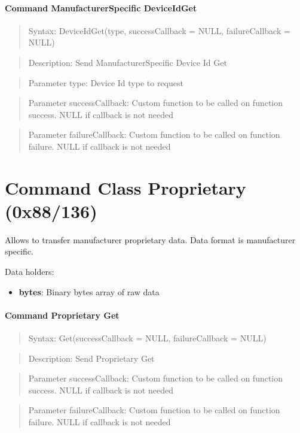 \paragraph{Command ManufacturerSpecific DeviceIdGet}
\begin{quote}Syntax: DeviceIdGet(type, successCallback = NULL, failureCallback = NULL)\end{quote}
\begin{quote}Description: Send ManufacturerSpecific Device Id Get\end{quote}
\begin{quote}Parameter type: Device Id type to request\end{quote}
\begin{quote}Parameter successCallback: Custom function to be called on function success. NULL if callback is not needed\end{quote}
\begin{quote}Parameter failureCallback: Custom function to be called on function failure. NULL if callback is not needed\end{quote}



\section{Command Class Proprietary (0x88/136)}

Allows to transfer manufacturer proprietary data. Data format is manufacturer specific.
\newline

\noindent
Data holders:

\begin{itemize}
\item \textbf{bytes}: Binary bytes array of raw data
\end{itemize}

\paragraph{Command Proprietary Get}
\begin{quote}Syntax: Get(successCallback = NULL, failureCallback = NULL)\end{quote}
\begin{quote}Description: Send Proprietary Get\end{quote}
\begin{quote}Parameter successCallback: Custom function to be called on function success. NULL if callback is not needed\end{quote}
\begin{quote}Parameter failureCallback: Custom function to be called on function failure. NULL if callback is not needed\end{quote}


